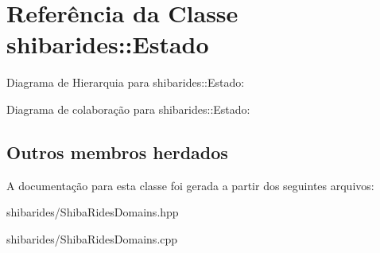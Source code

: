 \hypertarget{classshibarides_1_1Estado}{}\section{Referência da Classe shibarides\+:\+:Estado}
\label{classshibarides_1_1Estado}


Diagrama de Hierarquia para shibarides\+:\+:Estado\+:


Diagrama de colaboração para shibarides\+:\+:Estado\+:
\subsection*{Outros membros herdados}


A documentação para esta classe foi gerada a partir dos seguintes arquivos\+:\begin{DoxyCompactItemize}
\item 
shibarides/Shiba\+Rides\+Domains.\+hpp\item 
shibarides/Shiba\+Rides\+Domains.\+cpp\end{DoxyCompactItemize}
